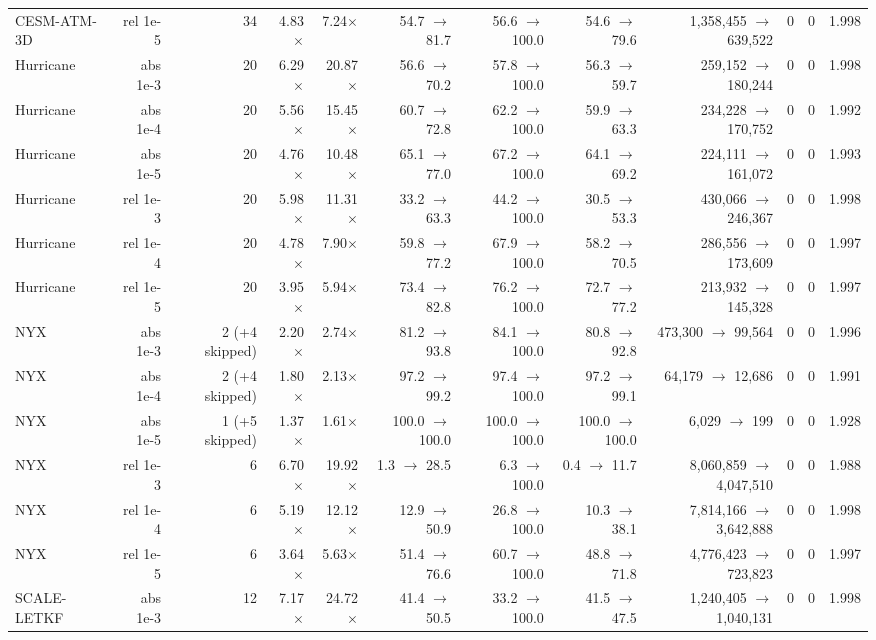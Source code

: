 \begin{tabular}{lrrrrrrrrrrr}
CESM-ATM-3D & rel 1e-5 & 34 & 4.83$\times$ & 7.24$\times$ & 54.7 $\to$ 81.7 & 56.6 $\to$ 100.0 & 54.6 $\to$ 79.6 & 1,358,455 $\to$ 639,522 & 0 & 0 & 1.998 \\
Hurricane & abs 1e-3 & 20 & 6.29$\times$ & 20.87$\times$ & 56.6 $\to$ 70.2 & 57.8 $\to$ 100.0 & 56.3 $\to$ 59.7 & 259,152 $\to$ 180,244 & 0 & 0 & 1.998 \\
Hurricane & abs 1e-4 & 20 & 5.56$\times$ & 15.45$\times$ & 60.7 $\to$ 72.8 & 62.2 $\to$ 100.0 & 59.9 $\to$ 63.3 & 234,228 $\to$ 170,752 & 0 & 0 & 1.992 \\
Hurricane & abs 1e-5 & 20 & 4.76$\times$ & 10.48$\times$ & 65.1 $\to$ 77.0 & 67.2 $\to$ 100.0 & 64.1 $\to$ 69.2 & 224,111 $\to$ 161,072 & 0 & 0 & 1.993 \\
Hurricane & rel 1e-3 & 20 & 5.98$\times$ & 11.31$\times$ & 33.2 $\to$ 63.3 & 44.2 $\to$ 100.0 & 30.5 $\to$ 53.3 & 430,066 $\to$ 246,367 & 0 & 0 & 1.998 \\
Hurricane & rel 1e-4 & 20 & 4.78$\times$ & 7.90$\times$ & 59.8 $\to$ 77.2 & 67.9 $\to$ 100.0 & 58.2 $\to$ 70.5 & 286,556 $\to$ 173,609 & 0 & 0 & 1.997 \\
Hurricane & rel 1e-5 & 20 & 3.95$\times$ & 5.94$\times$ & 73.4 $\to$ 82.8 & 76.2 $\to$ 100.0 & 72.7 $\to$ 77.2 & 213,932 $\to$ 145,328 & 0 & 0 & 1.997 \\
NYX & abs 1e-3 & 2 (+4 skipped) & 2.20$\times$ & 2.74$\times$ & 81.2 $\to$ 93.8 & 84.1 $\to$ 100.0 & 80.8 $\to$ 92.8 & 473,300 $\to$ 99,564 & 0 & 0 & 1.996 \\
NYX & abs 1e-4 & 2 (+4 skipped) & 1.80$\times$ & 2.13$\times$ & 97.2 $\to$ 99.2 & 97.4 $\to$ 100.0 & 97.2 $\to$ 99.1 & 64,179 $\to$ 12,686 & 0 & 0 & 1.991 \\
NYX & abs 1e-5 & 1 (+5 skipped) & 1.37$\times$ & 1.61$\times$ & 100.0 $\to$ 100.0 & 100.0 $\to$ 100.0 & 100.0 $\to$ 100.0 & 6,029 $\to$ 199 & 0 & 0 & 1.928 \\
NYX & rel 1e-3 & 6 & 6.70$\times$ & 19.92$\times$ & 1.3 $\to$ 28.5 & 6.3 $\to$ 100.0 & 0.4 $\to$ 11.7 & 8,060,859 $\to$ 4,047,510 & 0 & 0 & 1.988 \\
NYX & rel 1e-4 & 6 & 5.19$\times$ & 12.12$\times$ & 12.9 $\to$ 50.9 & 26.8 $\to$ 100.0 & 10.3 $\to$ 38.1 & 7,814,166 $\to$ 3,642,888 & 0 & 0 & 1.998 \\
NYX & rel 1e-5 & 6 & 3.64$\times$ & 5.63$\times$ & 51.4 $\to$ 76.6 & 60.7 $\to$ 100.0 & 48.8 $\to$ 71.8 & 4,776,423 $\to$ 723,823 & 0 & 0 & 1.997 \\
SCALE-LETKF & abs 1e-3 & 12 & 7.17$\times$ & 24.72$\times$ & 41.4 $\to$ 50.5 & 33.2 $\to$ 100.0 & 41.5 $\to$ 47.5 & 1,240,405 $\to$ 1,040,131 & 0 & 0 & 1.998 \\

\end{tabular}
